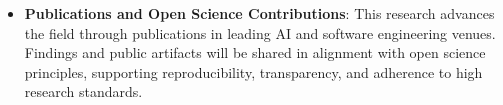 \begin{itemize}
    \item \textbf{Publications and Open Science Contributions}: This research advances the field through publications in leading AI and software engineering venues. Findings and public artifacts will be shared in alignment with open science principles, supporting reproducibility, transparency, and adherence to high research standards.
\end{itemize}


